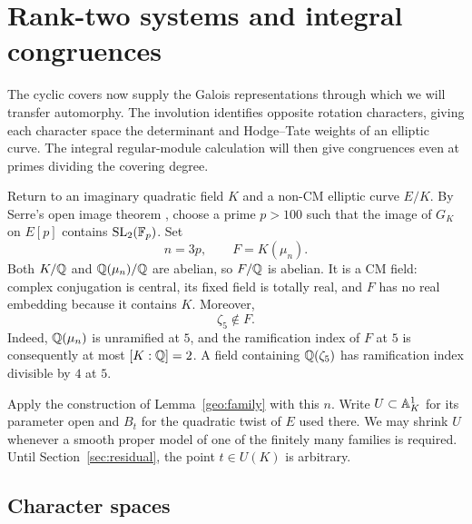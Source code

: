 \section{Rank-two systems and integral congruences}\label{sec:systems}

The cyclic covers now supply the Galois representations through which we
will transfer automorphy.  The involution identifies opposite rotation
characters, giving each character space the determinant and Hodge--Tate
weights of an elliptic curve.  The integral regular-module calculation
will then give congruences even at primes dividing the covering degree.

Return to an imaginary quadratic field $K$ and a non-CM elliptic curve
$E/K$.  By Serre's open image theorem \cite[\S4.4, Th\'eor\`eme~3]{SerreOpenImage}, choose a prime
$p>100$ such that the image of $G_K$ on $E[p]$ contains
$\operatorname{SL}_2(\mathbb F_p)$.  Set
\begin{equation}\label{sys:standing-fields}
 n=3p,\qquad F=K(\mu_n).
\end{equation}
Both $K/\mathbb Q$ and $\mathbb Q(\mu_n)/\mathbb Q$ are abelian, so $F/\mathbb Q$ is abelian.
It is a CM field: complex conjugation is central, its fixed field is
totally real, and $F$ has no real embedding because it contains $K$.
Moreover,
\begin{equation}\label{sys:no-fifth-roots}
 \zeta_5\notin F.
\end{equation}
Indeed, $\mathbb Q(\mu_n)$ is unramified at $5$, and the ramification index
of $F$ at $5$ is consequently at most $[K:\mathbb Q]=2$.  A field containing
$\mathbb Q(\zeta_5)$ has ramification index divisible by $4$ at $5$.

Apply the construction of Lemma~\ref{geo:family} with this $n$.
Write $U\subset\mathbb A^1_K$ for its parameter open and $B_t$ for the
quadratic twist of $E$ used there.  We may shrink $U$ whenever a smooth
proper model of one of the finitely many families is required.  Until
Section~\ref{sec:residual}, the point $t\in U(K)$ is arbitrary.

\subsection{Character spaces}


